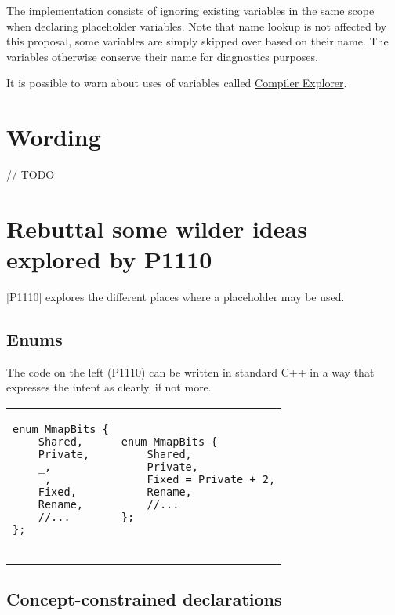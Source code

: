 \documentclass{wg21}
\begin{document}
{The implementation consists of ignoring existing \tcode{_} variables in the same scope when declaring placeholder variables.
Note that name lookup is not affected by this proposal, some variables are simply skipped over based on their name.
The variables otherwise conserve their name for diagnostics purposes.

It is possible to warn about uses of variables called \tcode{_} \href{https://godbolt.org/z/pQeu_r }{Compiler Explorer}.


\section{Wording}

// TODO

\section{Rebuttal some wilder ideas explored by P1110}

[P1110] explores the different places where a placeholder may be used.


\subsection{Enums}

The code on the left (P1110) can be written in standard C++ in a way that expresses the intent as clearly, if not more. 

\begin{center}
\begin{tabular}{l|l}
\begin{minipage}[t]{0.5\textwidth}
\begin{lstlisting}[style=color]
enum MmapBits {
    Shared,
    Private,
    _,
    _,
    Fixed,
    Rename,
    //...
};
    
\end{lstlisting}
\end{minipage}
&
\begin{minipage}[t]{0.5\textwidth}
\begin{lstlisting}[style=color]
enum MmapBits {
    Shared,
    Private,
    Fixed = Private + 2,
    Rename,
    //...
};
    
\end{lstlisting}
\end{minipage}
\end{tabular}
\end{center}

\subsection{Concept-constrained declarations}

}
\end{document}
